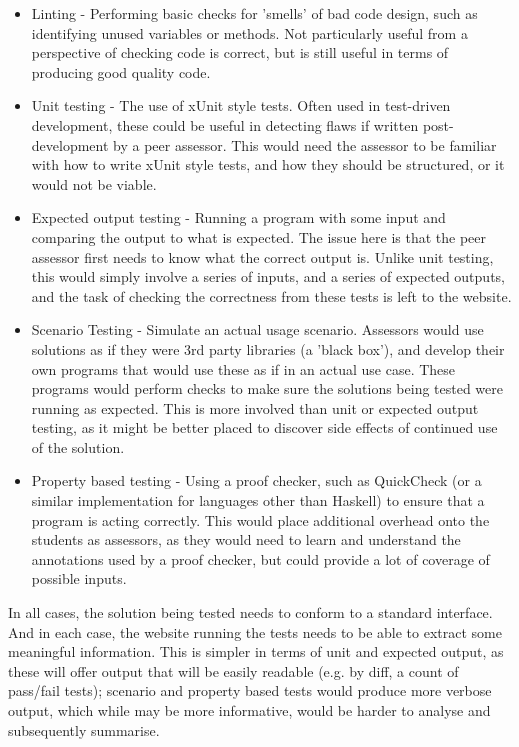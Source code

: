 \documentclass[a4paper,11pt]{report}
\begin{document}
\begin{itemize}
 \item Linting - Performing basic checks for 'smells' of bad code design, such as identifying unused variables or methods. Not particularly useful from a perspective of checking code is correct, but is still useful in terms of producing good quality code.
 \item Unit testing - The use of xUnit style tests. Often used in test-driven development, these could be useful in detecting flaws if written post-development by a peer assessor. This would need the assessor to be familiar with how to write xUnit style tests, and how they should be structured, or it would not be viable.
 \item Expected output testing - Running a program with some input and comparing the output to what is expected. The issue here is that the peer assessor first needs to know what the correct output is. Unlike unit testing, this would simply involve a series of inputs, and a series of expected outputs, and the task of checking the correctness from these tests is left to the website.
 \item Scenario Testing - Simulate an actual usage scenario. Assessors would use solutions as if they were 3rd party libraries (a 'black box'), and develop their own programs that would use these as if in an actual use case. These programs would perform checks to make sure the solutions being tested were running as expected. This is more involved than unit or expected output testing, as it might be better placed to discover side effects of continued use of the solution.
 \item Property based testing - Using a proof checker, such as QuickCheck (or a similar implementation for languages other than Haskell) to ensure that a program is acting correctly. This would place additional overhead onto the students as assessors, as they would need to learn and understand the annotations used by a proof checker, but could provide a lot of coverage of possible inputs.
\end{itemize}
In all cases, the solution being tested needs to conform to a standard interface. And in each case, the website running the tests needs to be able to extract some meaningful information. This is simpler in terms of unit and expected output, as these will offer output that will be easily readable (e.g. by diff, a count of pass/fail tests); scenario and property based tests would produce more verbose output, which while may be more informative, would be harder to analyse and subsequently summarise. 
\end{document}
